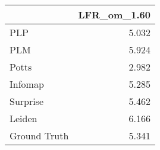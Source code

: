 \begin{tabular}{lr}
\toprule
{} & LFR_om_1.60 \\
\midrule
PLP          &       5.032 \\
PLM          &       5.924 \\
Potts        &       2.982 \\
Infomap      &       5.285 \\
Surprise     &       5.462 \\
Leiden       &       6.166 \\
Ground Truth &       5.341 \\
\bottomrule
\end{tabular}
